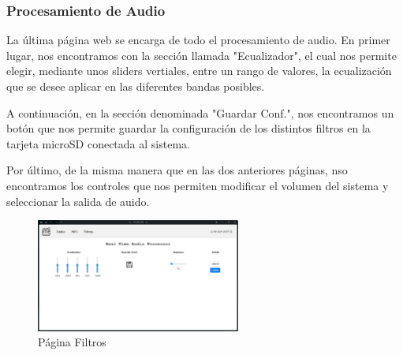 \subsubsection{Procesamiento de Audio}

La última página web se encarga de todo el procesamiento de audio. En primer lugar, nos encontramos con la sección llamada "Ecualizador", el cual nos permite elegir, mediante unos sliders vertiales, entre un rango de valores, la ecualización que se desee aplicar en las diferentes bandas posibles.

A continuación, en la sección denominada "Guardar Conf.", nos encontramos un botón que nos permite guardar la configuración de los distintos filtros en la tarjeta microSD conectada al sistema.

Por último, de la misma manera que en las dos anteriores páginas, nso encontramos los controles que nos permiten modificar el volumen del sistema y seleccionar la salida de auido.

\begin{figure}[h]
    \centering
    \includegraphics[width=0.6\textwidth]{images/3/3-1/3-1-1-4/Pagina_Filtros.png}
    \caption{Página Filtros}
    \label{fig:3-1-1-4-Filtros}
\end{figure}